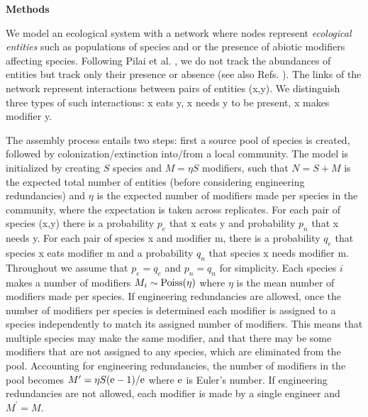 \documentclass[twocolumn,preprintnumbers,amsmath,amssymb,superscriptaddress,linenumbers]{revtex4-1}
\newcommand{\rr}[1]{{\rm #1}}
\begin{document}









\vspace{-2mm}
\noindent \textbf{Methods}\\
  \footnotesize{
  We model an ecological system with a network where nodes represent \emph{ecological entities} such as populations of species and or the presence of abiotic modifiers affecting species.
  Following Pilai et al. \cite{Pillai2011}, we do not track the abundances of entities but track only their presence or absence (see also Refs. ).
  The links of the network represent interactions between pairs of entities (x,y).
  We distinguish three types of such interactions: x eats y, x needs y to be present, x makes modifier y.

  The assembly process entails two steps: first a source pool of species is created, followed by colonization/extinction into/from a local community.
  The model is initialized by creating $S$ species and $M = \eta S$ modifiers, such that $N=S+M$ is the expected total number of entities (before considering engineering redundancies) and $\eta$ is the expected number of modifiers made per species in the community, where the expectation is taken across replicates.
  For each pair of species (x,y) there is a probability $p_e$ that x eats y and probability $p_n$ that x needs y.
  For each pair of species x and modifier m, there is a probability $q_e$ that species x eats modifier m and a probability $q_n$ that species x needs modifier m.
  Throughout we assume that $p_e = q_e$ and $p_n = q_n$ for simplicity.
  Each species $i$ makes a number of modifiers $M_i \sim \rr{Poiss}(\eta)$ where $\eta$ is the mean number of modifiers made per species.
  If engineering redundancies are allowed, once the number of modifiers per species is determined each modifier is assigned to a species independently to match its assigned number of modifiers.
  This means that multiple species may make the same modifier, and that there may be some modifiers that are not assigned to any species, which are eliminated from the pool.
  Accounting for engineering redundancies, the number of modifiers in the pool becomes $M^\prime = \eta S (\rr{e}-1)/\rr{e}$ where $\rr{e}$ is Euler's number.
  If engineering redundancies are not allowed, each modifier is made by a single engineer and $M^\prime = M$.
  
}
\end{document}
